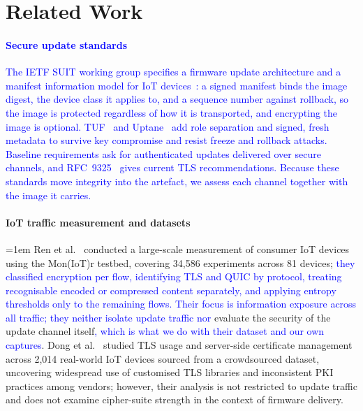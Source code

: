 \section{Related Work}
\label{sec:related}

\paragraph{\textcolor{blue}{Secure update standards}}
\textcolor{blue}{The IETF SUIT working group specifies a firmware update architecture and a manifest information model for IoT devices~\cite{rfc9019,rfc9124}: a signed manifest binds the image digest, the device class it applies to, and a sequence number against rollback, so the image is protected regardless of how it is transported, and encrypting the image is optional.
TUF~\cite{samuel2010tuf} and Uptane~\cite{kuppusamy2016uptane} add role separation and signed, fresh metadata to survive key compromise and resist freeze and rollback attacks.
Baseline requirements ask for authenticated updates delivered over secure channels, and RFC~9325~\cite{rfc9325} gives current TLS recommendations.
Because these standards move integrity into the artefact, we assess each channel together with the image it carries.}

\paragraph{IoT traffic measurement and datasets}
{\emergencystretch=1em %
Ren et al.~\cite{10.1145/3355369.3355577} conducted a large-scale measurement of consumer IoT devices using the Mon(IoT)r testbed, covering 34,586 experiments across 81 devices; \textcolor{blue}{they classified encryption per flow, identifying TLS and QUIC by protocol, treating recognisable encoded or compressed content separately, and applying entropy thresholds only to the remaining flows. Their focus is information exposure across all traffic; they neither isolate update traffic nor} evaluate the security of the update channel itself\textcolor{blue}{, which is what we do with their dataset and our own captures}.
Dong et al.~\cite{10.1145/3618257.3624815} studied TLS usage and server-side certificate management across 2,014 real-world IoT devices sourced from a crowdsourced dataset, uncovering widespread use of customised TLS libraries and inconsistent PKI practices among vendors; however, their analysis is not restricted to update traffic and does not examine cipher-suite strength in the context of firmware delivery.\par}

